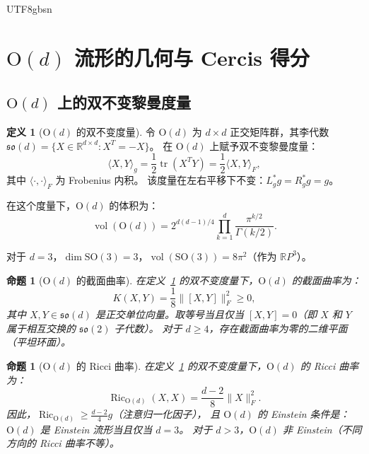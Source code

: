\documentclass[12pt,a4paper]{article}
\theoremstyle{plain}
\newtheorem{proposition}[theorem]{命题}
\theoremstyle{definition}
\newtheorem{definition}[theorem]{定义}
\theoremstyle{remark}
\newcommand{\R}{\mathbb{R}}
\newcommand{\Od}{\mathrm{O}(d)}
\newcommand{\SO}{\mathrm{SO}}
\newcommand{\sod}{\mathfrak{so}(d)}
\DeclareMathOperator{\vol}{vol}
\DeclareMathOperator{\tr}{tr}
\DeclareMathOperator{\Ric}{Ric}
\begin{document}
\begin{CJK}{UTF8}{gbsn}
\section{$\Od$ 流形的几何与 Cercis 得分}

\subsection{$\Od$ 上的双不变黎曼度量}

\begin{definition}[$\Od$ 的双不变度量]\label{def:biinvariant}
令 $\Od$ 为 $d \times d$ 正交矩阵群，其李代数 $\sod = \{X \in \R^{d \times d} : X^T = -X\}$。
在 $\Od$ 上赋予双不变黎曼度量：
\begin{equation}
    \langle X, Y \rangle_g = \frac{1}{2}\tr(X^T Y) = \frac{1}{2}\langle X, Y \rangle_F,
\end{equation}
其中 $\langle \cdot, \cdot \rangle_F$ 为 Frobenius 内积。
该度量在左右平移下不变：$L_g^* g = R_g^* g = g$。
\end{definition}

在这个度量下，$\Od$ 的体积为：
\begin{equation}\label{eq:vol_od}
    \vol(\Od) = 2^{d(d-1)/4} \prod_{k=1}^{d} \frac{\pi^{k/2}}{\Gamma(k/2)}.
\end{equation}

对于 $d=3$，$\dim \SO(3) = 3$，$\vol(\SO(3)) = 8\pi^2$（作为 $\R P^3$）。

\begin{proposition}[$\Od$ 的截面曲率]\label{prop:curvature}
在定义~\ref{def:biinvariant} 的双不变度量下，$\Od$ 的截面曲率为：
\begin{equation}
    K(X, Y) = \frac{1}{8}\|[X, Y]\|_F^2 \geq 0,
\end{equation}
其中 $X, Y \in \sod$ 是正交单位向量。取等号当且仅当 $[X, Y] = 0$（即 $X$ 和 $Y$ 属于相互交换的 $\mathfrak{so}(2)$ 子代数）。
对于 $d \geq 4$，存在截面曲率为零的二维平面（平坦环面）。
\end{proposition}

\begin{proposition}[$\Od$ 的 Ricci 曲率]\label{prop:ricci}
在定义~\ref{def:biinvariant} 的双不变度量下，$\Od$ 的 Ricci 曲率为：
\begin{equation}
    \Ric_{\Od}(X, X) = \frac{d-2}{8}\|X\|_F^2.
\end{equation}
因此，$\Ric_{\Od} \geq \frac{d-2}{4} g$（注意归一化因子），
且 $\Od$ 的 Einstein 条件是：$\Od$ 是 Einstein 流形当且仅当 $d=3$。
对于 $d > 3$，$\Od$ 非 Einstein（不同方向的 Ricci 曲率不等）。
\end{proposition}


\end{CJK}
\end{document}
